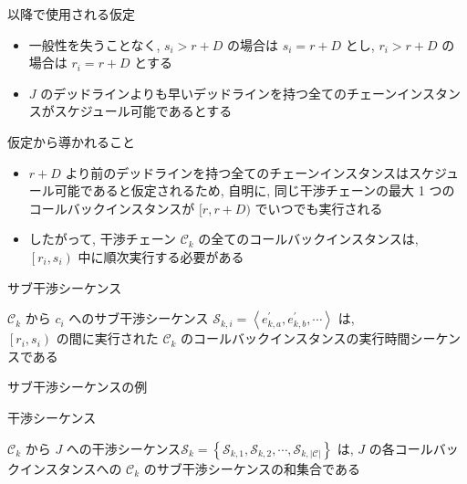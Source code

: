 \begin{frame}{以降で使用される仮定}
    \begin{itemize}
        \item 一般性を失うことなく, $s_{i}>r+D$ の場合は $s_{i}=r+D$ とし, $r_{i}>r+D$ の場合は $r_{i}=r+D$ とする
        \item $J$ のデッドラインよりも早いデッドラインを持つ全てのチェーンインスタンスがスケジュール可能であるとする 
    \end{itemize}
\end{frame}

\begin{frame}{仮定から導かれること}
    \begin{itemize}
        \item  $r+D$ より前のデッドラインを持つ全てのチェーンインスタンスはスケジュール可能であると仮定されるため, 自明に, 同じ干渉チェーンの最大 1 つのコールバックインスタンスが $[r, r+D)$ でいつでも実行される
        \item したがって, 干渉チェーン $\mathcal{C}_{k}$ の全てのコールバックインスタンスは, $\left[r_{i}, s_{i}\right)$ 中に順次実行する必要がある
    \end{itemize}
\end{frame}

\begin{frame}{サブ干渉シーケンス}
    \begin{definition}[サブ干渉シーケンス]
        $\mathcal{C}_{k}$ から $c_{i}$ へのサブ干渉シーケンス $\mathcal{S}_{k, i}=\left\langle e_{k, a}^{\prime}, e_{k, b}^{\prime}, \cdots\right\rangle$ は, \\$\left[r_{i}, s_{i}\right)$ の間に実行された $\mathcal{C}_{k}$ のコールバックインスタンスの実行時間シーケンスである
    \end{definition}
    \vspace{5mm}
\end{frame}

\begin{frame}{サブ干渉シーケンスの例}
\end{frame}

\begin{frame}{干渉シーケンス}
    \begin{definition}[干渉シーケンス]
        $\mathcal{C}_{k}$ から $J$ への干渉シーケンス$\mathcal{S}_{k}=\left\{\mathcal{S}_{k, 1}, \mathcal{S}_{k, 2}, \cdots, \mathcal{S}_{k,|\mathcal{C}|}\right\}$ は, $J$ の各コールバックインスタンスへの $\mathcal{C}_{k}$ のサブ干渉シーケンスの和集合である
    \end{definition}
\end{frame}

